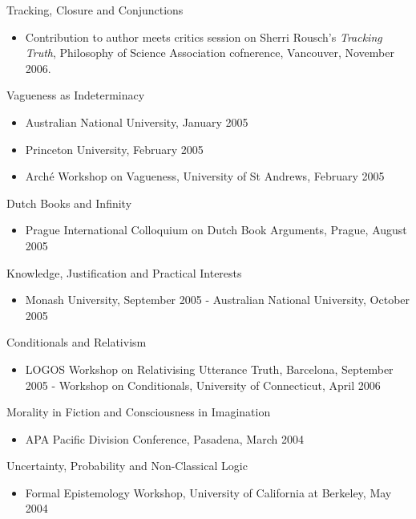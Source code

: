 \documentclass[
  10pt,
  letterpaper,
  DIV=11,
  numbers=noendperiod,
  twoside]{scrartcl}
\providecommand{\tightlist}{%
  \setlength{\itemsep}{0pt}\setlength{\parskip}{0pt}}\usepackage{longtable,booktabs,array}
\begin{document}
Tracking, Closure and Conjunctions

\begin{itemize}
\tightlist
\item
  Contribution to author meets critics session on Sherri Rousch's
  \emph{Tracking Truth}, Philosophy of Science Association cofnerence,
  Vancouver, November 2006.
\end{itemize}

Vagueness as Indeterminacy

\begin{itemize}
\tightlist
\item
  Australian National University, January 2005
\item
  Princeton University, February 2005
\item
  Arché Workshop on Vagueness, University of St Andrews, February 2005
\end{itemize}

Dutch Books and Infinity

\begin{itemize}
\tightlist
\item
  Prague International Colloquium on Dutch Book Arguments, Prague,
  August 2005
\end{itemize}

Knowledge, Justification and Practical Interests

\begin{itemize}
\tightlist
\item
  Monash University, September 2005 - Australian National University,
  October 2005
\end{itemize}

Conditionals and Relativism

\begin{itemize}
\tightlist
\item
  LOGOS Workshop on Relativising Utterance Truth, Barcelona, September
  2005 - Workshop on Conditionals, University of Connecticut, April 2006
\end{itemize}

Morality in Fiction and Consciousness in Imagination

\begin{itemize}
\tightlist
\item
  APA Pacific Division Conference, Pasadena, March 2004
\end{itemize}

Uncertainty, Probability and Non-Classical Logic

\begin{itemize}
\tightlist
\item
  Formal Epistemology Workshop, University of California at Berkeley,
  May 2004
\end{itemize}
\end{document}
